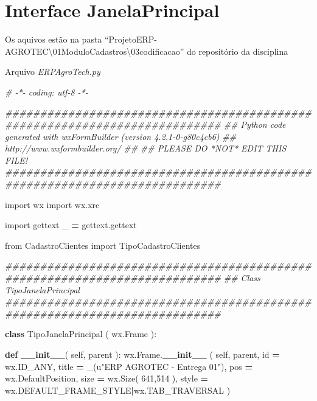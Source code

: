 \documentclass[
]{book}
\newenvironment{Shaded}{\begin{snugshade}}{\end{snugshade}}
\newcommand{\BuiltInTok}[1]{#1}
\newcommand{\CommentTok}[1]{\textcolor[rgb]{0.56,0.35,0.01}{\textit{#1}}}
\newcommand{\DecValTok}[1]{\textcolor[rgb]{0.00,0.00,0.81}{#1}}
\newcommand{\FunctionTok}[1]{\textcolor[rgb]{0.13,0.29,0.53}{\textbf{#1}}}
\newcommand{\ImportTok}[1]{#1}
\newcommand{\KeywordTok}[1]{\textcolor[rgb]{0.13,0.29,0.53}{\textbf{#1}}}
\newcommand{\NormalTok}[1]{#1}
\newcommand{\OperatorTok}[1]{\textcolor[rgb]{0.81,0.36,0.00}{\textbf{#1}}}
\newcommand{\StringTok}[1]{\textcolor[rgb]{0.31,0.60,0.02}{#1}}
\newcommand{\VariableTok}[1]{\textcolor[rgb]{0.00,0.00,0.00}{#1}}
\begin{document}
\section{Interface JanelaPrincipal}\label{interface-janelaprincipal}

Os aquivos estão na pasta ``ProjetoERP-AGROTEC\textbackslash01ModuloCadastros\textbackslash03codificacao\source'' do repositório da disciplina

Arquivo \emph{ERPAgroTech.py}

\begin{Shaded}
\begin{Highlighting}[]

\CommentTok{\# {-}*{-} coding: utf{-}8 {-}*{-}}

\CommentTok{\#\#\#\#\#\#\#\#\#\#\#\#\#\#\#\#\#\#\#\#\#\#\#\#\#\#\#\#\#\#\#\#\#\#\#\#\#\#\#\#\#\#\#\#\#\#\#\#\#\#\#\#\#\#\#\#\#\#\#\#\#\#\#\#\#\#\#\#\#\#\#\#\#\#\#}
\CommentTok{\#\# Python code generated with wxFormBuilder (version 4.2.1{-}0{-}g80c4cb6)}
\CommentTok{\#\# http://www.wxformbuilder.org/}
\CommentTok{\#\#}
\CommentTok{\#\# PLEASE DO *NOT* EDIT THIS FILE!}
\CommentTok{\#\#\#\#\#\#\#\#\#\#\#\#\#\#\#\#\#\#\#\#\#\#\#\#\#\#\#\#\#\#\#\#\#\#\#\#\#\#\#\#\#\#\#\#\#\#\#\#\#\#\#\#\#\#\#\#\#\#\#\#\#\#\#\#\#\#\#\#\#\#\#\#\#\#\#}

\ImportTok{import}\NormalTok{ wx}
\ImportTok{import}\NormalTok{ wx.xrc}

\ImportTok{import}\NormalTok{ gettext}
\NormalTok{\_ }\OperatorTok{=}\NormalTok{ gettext.gettext}


\ImportTok{from}\NormalTok{ CadastroClientes }\ImportTok{import}\NormalTok{ TipoCadastroClientes}

\CommentTok{\#\#\#\#\#\#\#\#\#\#\#\#\#\#\#\#\#\#\#\#\#\#\#\#\#\#\#\#\#\#\#\#\#\#\#\#\#\#\#\#\#\#\#\#\#\#\#\#\#\#\#\#\#\#\#\#\#\#\#\#\#\#\#\#\#\#\#\#\#\#\#\#\#\#\#}
\CommentTok{\#\# Class TipoJanelaPrincipal}
\CommentTok{\#\#\#\#\#\#\#\#\#\#\#\#\#\#\#\#\#\#\#\#\#\#\#\#\#\#\#\#\#\#\#\#\#\#\#\#\#\#\#\#\#\#\#\#\#\#\#\#\#\#\#\#\#\#\#\#\#\#\#\#\#\#\#\#\#\#\#\#\#\#\#\#\#\#\#}

\KeywordTok{class}\NormalTok{ TipoJanelaPrincipal ( wx.Frame ):}

   \KeywordTok{def} \FunctionTok{\_\_init\_\_}\NormalTok{( }\VariableTok{self}\NormalTok{, parent ):}
\NormalTok{       wx.Frame.}\FunctionTok{\_\_init\_\_}\NormalTok{ ( }\VariableTok{self}\NormalTok{, parent, }\BuiltInTok{id} \OperatorTok{=}\NormalTok{ wx.ID\_ANY, title }\OperatorTok{=}\NormalTok{ \_(}\StringTok{u"ERP AGROTEC {-} Entrega 01"}\NormalTok{), pos }\OperatorTok{=}\NormalTok{ wx.DefaultPosition, size }\OperatorTok{=}\NormalTok{ wx.Size( }\DecValTok{641}\NormalTok{,}\DecValTok{514}\NormalTok{ ), style }\OperatorTok{=}\NormalTok{ wx.DEFAULT\_FRAME\_STYLE}\OperatorTok{|}\NormalTok{wx.TAB\_TRAVERSAL )}


\end{Highlighting}
\end{Shaded}
\end{document}
